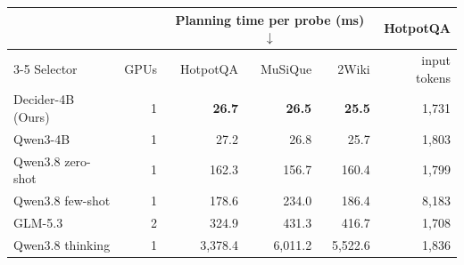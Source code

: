 \begin{tabular}{@{}lrrrrr@{}}
\toprule
 & & \multicolumn{3}{c}{Planning time per probe (ms)$\downarrow$} & HotpotQA\\
\cmidrule(lr){3-5}
Selector & GPUs & HotpotQA & MuSiQue & 2Wiki & input tokens\\
\midrule
Decider-4B (Ours) & 1 & \textbf{26.7} & \textbf{26.5} & \textbf{25.5} & 1,731\\
Qwen3-4B & 1 & 27.2 & 26.8 & 25.7 & 1,803\\
Qwen3.8 zero-shot & 1 & 162.3 & 156.7 & 160.4 & 1,799\\
Qwen3.8 few-shot & 1 & 178.6 & 234.0 & 186.4 & 8,183\\
GLM-5.3 & 2 & 324.9 & 431.3 & 416.7 & 1,708\\
Qwen3.8 thinking & 1 & 3,378.4 & 6,011.2 & 5,522.6 & 1,836\\
\bottomrule
\end{tabular}
